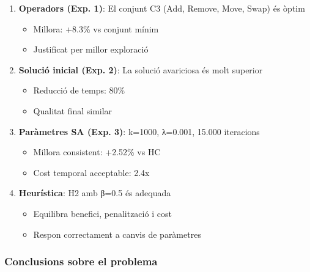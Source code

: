 \begin{enumerate}
    \item \textbf{Operadors (Exp. 1)}: El conjunt C3 (Add, Remove, Move, Swap) és òptim
    \begin{itemize}
        \item Millora: +8.3\% vs conjunt mínim
        \item Justificat per millor exploració
    \end{itemize}
    
    \item \textbf{Solució inicial (Exp. 2)}: La solució avariciosa és molt superior
    \begin{itemize}
        \item Reducció de temps: 80\%
        \item Qualitat final similar
    \end{itemize}
    
    \item \textbf{Paràmetres SA (Exp. 3)}: k=1000, λ=0.001, 15.000 iteracions
    \begin{itemize}
        \item Millora consistent: +2.52\% vs HC
        \item Cost temporal acceptable: 2.4x
    \end{itemize}
    
    \item \textbf{Heurística}: H2 amb β=0.5 és adequada
    \begin{itemize}
        \item Equilibra benefici, penalització i cost
        \item Respon correctament a canvis de paràmetres
    \end{itemize}
\end{enumerate}

\subsubsection{Conclusions sobre el problema}

